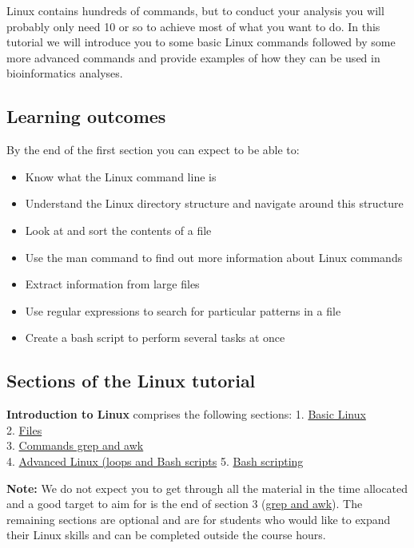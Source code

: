 \documentclass[11pt]{article}
\providecommand{\tightlist}{%
      \setlength{\itemsep}{0pt}\setlength{\parskip}{0pt}}
\begin{document}
Linux contains hundreds of commands, but to conduct your analysis you
will probably only need 10 or so to achieve most of what you want to do.
In this tutorial we will introduce you to some basic Linux commands
followed by some more advanced commands and provide examples of how they
can be used in bioinformatics analyses.

\hypertarget{learning-outcomes}{%
\subsection{Learning outcomes}\label{learning-outcomes}}

By the end of the first section you can expect to be able to:

\begin{itemize}
\tightlist
\item
  Know what the Linux command line is
\item
  Understand the Linux directory structure and navigate around this
  structure
\item
  Look at and sort the contents of a file
\item
  Use the man command to find out more information about Linux commands
\item
  Extract information from large files
\item
  Use regular expressions to search for particular patterns in a file
\item
  Create a bash script to perform several tasks at once
\end{itemize}

\hypertarget{sections-of-the-linux-tutorial}{%
\subsection{Sections of the Linux
tutorial}\label{sections-of-the-linux-tutorial}}

\textbf{Introduction to Linux} comprises the following sections: 1.
\href{basic.ipynb}{Basic Linux}\\
2. \href{files.ipynb}{Files}\\
3. \href{grep_and_awk.ipynb}{Commands grep and awk}\\
4. \href{advanced_linux.ipynb}{Advanced Linux (loops and Bash scripts}
5. \href{bash.ipynb}{Bash scripting}

\textbf{Note:} We do not expect you to get through all the material in
the time allocated and a good target to aim for is the end of section 3
(\href{grep_and_awk.ipynb}{grep and awk}). The remaining sections are
optional and are for students who would like to expand their Linux
skills and can be completed outside the course hours.
\end{document}
